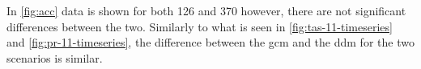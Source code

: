 In \autoref{fig:acc} data is shown for both \gls{126} and \gls{370} however, there are not significant differences between the two. Similarly to what is seen in \autoref{fig:tas-11-timeseries} and \autoref{fig:pr-11-timeseries}, the difference between the \gls{gcm} and the \gls{ddm} for the two \glspl{scenario} is similar.